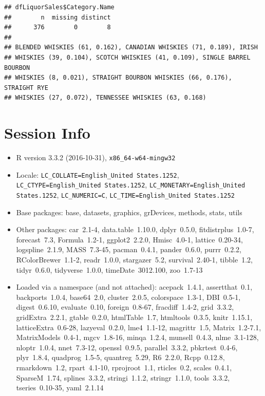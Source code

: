 \documentclass[]{elsarticle} %
\newenvironment{Shaded}{\begin{snugshade}}{\end{snugshade}}
\newcommand{\KeywordTok}[1]{\textcolor[rgb]{0.13,0.29,0.53}{\textbf{{#1}}}}
\newcommand{\NormalTok}[1]{{#1}}
\begin{document}
\begin{Shaded}
\end{Shaded}

\begin{verbatim}
## dfLiquorSales$Category.Name 
##        n  missing distinct 
##      376        0        8 
## 
## BLENDED WHISKIES (61, 0.162), CANADIAN WHISKIES (71, 0.189), IRISH
## WHISKIES (39, 0.104), SCOTCH WHISKIES (41, 0.109), SINGLE BARREL BOURBON
## WHISKIES (8, 0.021), STRAIGHT BOURBON WHISKIES (66, 0.176), STRAIGHT RYE
## WHISKIES (27, 0.072), TENNESSEE WHISKIES (63, 0.168)
\end{verbatim}

\section{Session Info}\label{session-info}

\begin{itemize}\raggedright
  \item R version 3.3.2 (2016-10-31), \verb|x86_64-w64-mingw32|
  \item Locale: \verb|LC_COLLATE=English_United States.1252|, \verb|LC_CTYPE=English_United States.1252|, \verb|LC_MONETARY=English_United States.1252|, \verb|LC_NUMERIC=C|, \verb|LC_TIME=English_United States.1252|
  \item Base packages: base, datasets, graphics, grDevices,
    methods, stats, utils
  \item Other packages: car~2.1-4, data.table~1.10.0, dplyr~0.5.0,
    fitdistrplus~1.0-7, forecast~7.3, Formula~1.2-1,
    ggplot2~2.2.0, Hmisc~4.0-1, lattice~0.20-34, logspline~2.1.9,
    MASS~7.3-45, pacman~0.4.1, pander~0.6.0, purrr~0.2.2,
    RColorBrewer~1.1-2, readr~1.0.0, stargazer~5.2,
    survival~2.40-1, tibble~1.2, tidyr~0.6.0, tidyverse~1.0.0,
    timeDate~3012.100, zoo~1.7-13
  \item Loaded via a namespace (and not attached): acepack~1.4.1,
    assertthat~0.1, backports~1.0.4, base64~2.0, cluster~2.0.5,
    colorspace~1.3-1, DBI~0.5-1, digest~0.6.10, evaluate~0.10,
    foreign~0.8-67, fracdiff~1.4-2, grid~3.3.2, gridExtra~2.2.1,
    gtable~0.2.0, htmlTable~1.7, htmltools~0.3.5, knitr~1.15.1,
    latticeExtra~0.6-28, lazyeval~0.2.0, lme4~1.1-12,
    magrittr~1.5, Matrix~1.2-7.1, MatrixModels~0.4-1, mgcv~1.8-16,
    minqa~1.2.4, munsell~0.4.3, nlme~3.1-128, nloptr~1.0.4,
    nnet~7.3-12, openssl~0.9.5, parallel~3.3.2, pbkrtest~0.4-6,
    plyr~1.8.4, quadprog~1.5-5, quantreg~5.29, R6~2.2.0,
    Rcpp~0.12.8, rmarkdown~1.2, rpart~4.1-10, rprojroot~1.1,
    rticles~0.2, scales~0.4.1, SparseM~1.74, splines~3.3.2,
    stringi~1.1.2, stringr~1.1.0, tools~3.3.2, tseries~0.10-35,
    yaml~2.1.14
\end{itemize}
\end{document}

